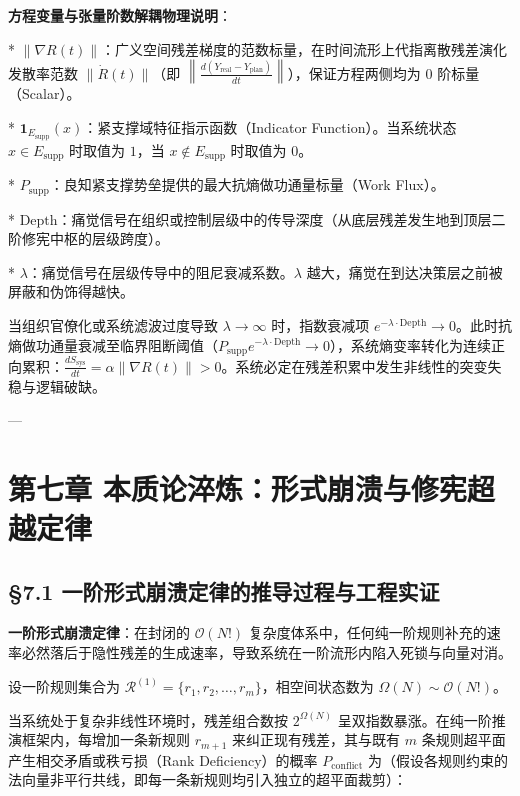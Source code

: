 \documentclass[11pt,a4paper,oneside]{ctexart}
\begin{document}
\begin{notebox}
\textbf{方程变量与张量阶数解耦物理说明}：

* $\|\nabla R(t)\|$：广义空间残差梯度的范数标量，在时间流形上代指离散残差演化发散率范数 $\|\dot{R}(t)\|$（即 $\left\| \frac{d (Y_{\text{real}} - Y_{\text{plan}})}{dt} \right\|$），保证方程两侧均为 0 阶标量（Scalar）。

* $\mathbf{1}_{E_{\text{supp}}}(x)$：紧支撑域特征指示函数（Indicator Function）。当系统状态 $x \in E_{\text{supp}}$ 时取值为 $1$，当 $x \notin E_{\text{supp}}$ 时取值为 $0$。

* $P_{\text{supp}}$：良知紧支撑势垒提供的最大抗熵做功通量标量（Work Flux）。

* $\text{Depth}$：痛觉信号在组织或控制层级中的传导深度（从底层残差发生地到顶层二阶修宪中枢的层级跨度）。

* $\lambda$：痛觉信号在层级传导中的阻尼衰减系数。$\lambda$ 越大，痛觉在到达决策层之前被屏蔽和伪饰得越快。
\end{notebox}

当组织官僚化或系统滤波过度导致 $\lambda \to \infty$ 时，指数衰减项 $e^{-\lambda \cdot \text{Depth}} \to 0$。此时抗熵做功通量衰减至临界阻断阈值（$P_{\text{supp}} e^{-\lambda \cdot \text{Depth}} \to 0$），系统熵变率转化为连续正向累积：$\frac{d S_{\text{sys}}}{dt} = \alpha \|\nabla R(t)\| > 0$。系统必定在残差积累中发生非线性的突变失稳与逻辑破缺。


---


\section{第七章 本质论淬炼：形式崩溃与修宪超越定律}

\subsection{§7.1 一阶形式崩溃定律的推导过程与工程实证}

\textbf{一阶形式崩溃定律}：在封闭的 $\mathcal{O}(N!)$ 复杂度体系中，任何纯一阶规则补充的速率必然落后于隐性残差的生成速率，导致系统在一阶流形内陷入死锁与向量对消。


设一阶规则集合为 $\mathcal{R}^{(1)} = \{r_1, r_2, \dots, r_m\}$，相空间状态数为 $\Omega(N) \sim \mathcal{O}(N!)$。


当系统处于复杂非线性环境时，残差组合数按 $2^{\Omega(N)}$ 呈双指数暴涨。在纯一阶推演框架内，每增加一条新规则 $r_{m+1}$ 来纠正现有残差，其与既有 $m$ 条规则超平面产生相交矛盾或秩亏损（Rank Deficiency）的概率 $P_{\text{conflict}}$ 为（假设各规则约束的法向量非平行共线，即每一条新规则均引入独立的超平面裁剪）：
\end{document}
